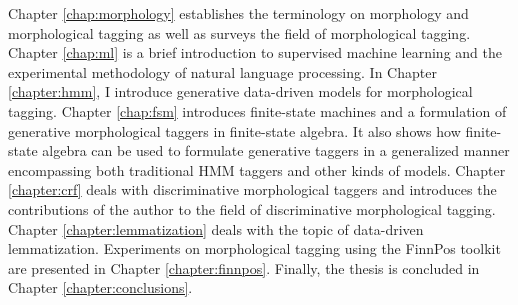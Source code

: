 Chapter \ref{chap:morphology} establishes the terminology on
morphology and morphological tagging as well as surveys the field of
morphological tagging.  Chapter \ref{chap:ml} is a brief introduction
to supervised machine learning and the experimental methodology of
natural language processing.  In Chapter \ref{chapter:hmm}, I
introduce generative data-driven models for morphological tagging.
Chapter \ref{chap:fsm} introduces finite-state machines and a
formulation of generative morphological taggers in finite-state
algebra. It also shows how finite-state algebra can be used to
formulate generative taggers in a generalized manner encompassing
both traditional HMM taggers and other kinds of models.  Chapter
\ref{chapter:crf} deals with discriminative morphological taggers and
introduces the contributions of the author to the field of
discriminative morphological tagging.  Chapter
\ref{chapter:lemmatization} deals with the topic of data-driven
lemmatization. Experiments on morphological tagging using the FinnPos
toolkit are presented in Chapter \ref{chapter:finnpos}. Finally, the
thesis is concluded in Chapter \ref{chapter:conclusions}.
